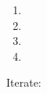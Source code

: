 \documentclass{article}
\begin{document}
\begin{enumerate}
\item {}

\item {}

\item {}

\item {}
\end{enumerate}

Iterate:
\begin{enumerate}
\foreachproblem{\item \thisproblem}
\end{enumerate}
\end{document}
